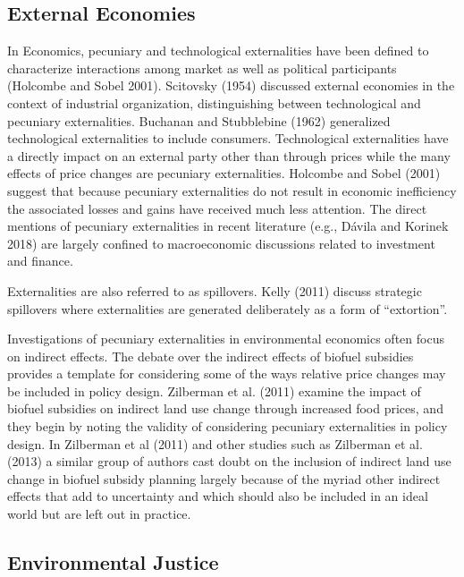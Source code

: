 \documentclass[ecta,nameyear,draft]{econsocart}
\theoremstyle{plain}
\theoremstyle{remark}
\begin{document}
\subsection{External Economies} 

In Economics, pecuniary and technological externalities have been defined to characterize interactions among market as well as political participants (Holcombe and Sobel 2001). Scitovsky (1954) discussed external economies in the context of industrial organization, distinguishing between technological and pecuniary externalities. Buchanan and Stubblebine (1962) generalized technological externalities to include consumers. Technological externalities have a directly impact on an external party other than through prices while the many effects of price changes are pecuniary externalities. Holcombe and Sobel (2001) suggest that because pecuniary externalities do not result in economic inefficiency the associated losses and gains have received much less attention. The direct mentions of pecuniary externalities in recent literature (e.g., Dávila and Korinek 2018) are largely confined to macroeconomic discussions related to investment and finance. 

Externalities are also referred to as spillovers. Kelly (2011) discuss strategic spillovers where externalities are generated deliberately as a form of “extortion”. 

Investigations of pecuniary externalities in environmental economics often focus on indirect effects. The debate over the indirect effects of biofuel subsidies provides a template for considering some of the ways relative price changes may be included in policy design. Zilberman et al. (2011) examine the impact of biofuel subsidies on indirect land use change through increased food prices, and they begin by noting the validity of considering pecuniary externalities in policy design. In Zilberman et al (2011) and other studies such as Zilberman et al. (2013) a similar group of authors cast doubt on the inclusion of indirect land use change in biofuel subsidy planning largely because of the myriad other indirect effects that add to uncertainty and which should also be included in an ideal world but are left out in practice. 





\subsection{Environmental Justice} 
\end{document}
